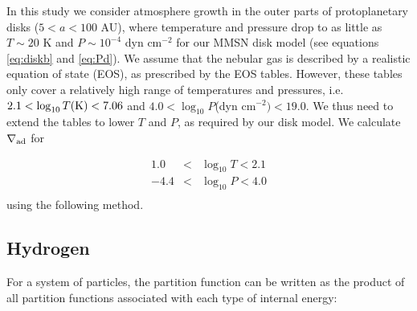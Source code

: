 \documentclass[apj]{emulateapj}
\newcommand{\delad}{\nabla_{\rm ad}}
\begin{document}
In this study we consider atmosphere growth in the outer parts of protoplanetary disks ($5<a<100$ AU), where temperature and pressure drop to as little as $T \sim 20$ K and $P \sim10^{-4}$ dyn cm$^{-2}$ for our MMSN disk model (see equations \ref{eq:diskb} and \ref{eq:Pd}). We assume that the nebular gas is described by a realistic equation of state (EOS), as prescribed by the \citet{saumon95} EOS tables. However, these tables only cover a relatively high range of temperatures and pressures, i.e. $2.1 < \log_{10} T(\rm{K})<7.06$ and $4.0<\log_{10}P$(dyn cm$^{-2})<19.0$. We thus need to extend the tables to lower $T$ and $P$, as required by our disk model. We calculate $\delad$ for

\begin{eqnarray}
1.0 & < & \log_{10} T <2.1 \\ 
-4.4& < & \log_{10} P<4.0 \\
\end{eqnarray} 
using the following method.





\subsection{Hydrogen}

\label{hydrogen}

For a system of particles, the partition function can be written as the product of all partition functions associated with each type of internal energy:
\end{document}
